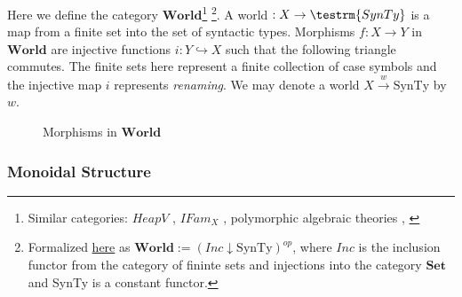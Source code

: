 \documentclass{article}
\newcommand{\world}{{\mathbf{World}}}
\begin{document}
 Here we define the category $\world$\footnote{Similar categories: $HeapV$ \cite{SIMPSON-Independence}, 
 $IFam_X$ \cite{sterlingFreeTheoremsUnivalent}, polymorphic algebraic theories \cite{fioreMultiversalPolymorphicAlgebraic2013},
 \cite{sterlingSyntaxSemanticsAbstract2016}}
 \footnote{Formalized 
 \href{https://github.com/bond15/Bunched-CBPV/blob/68f8b4d006edc9df1d830d7f9cc63822ec77a379/src/Data/Worlds.agda#L33}{here} 
 as $\world := (Inc \downarrow \textrm{SynTy})^{op}$, where $Inc$ is the inclusion functor from the category of fininte sets 
 and injections into the category $\mathbf{Set}$ and SynTy is a constant functor.}. 
 A world $: X \rightarrow \testrm{SynTy}$ is a map from a finite set into the set of syntactic types. Morphisms $f : X \rightarrow Y$ 
 in $\world$ are injective functions $i : Y \hookrightarrow X$ such that the 
 following triangle commutes. The finite sets here represent a finite 
 collection of case symbols and the injective map $i$ represents \textit{renaming}. We may denote a world $X \xrightarrow{w} \textrm{SynTy}$ 
 by $w$.
 

\begin{figure}[!ht]
    \centering
\caption{Morphisms in $\world$}
\end{figure}
 
 
\begin{comment}
Previously, I had maps between worlds as injections where the source map was 
included in the domain map. I've flipped the ordering to make the DCC obviously 
affine(monoidal unit is isomorphic to cartesian unit).    
\end{comment}



  \subsubsection{Monoidal Structure}
\end{document}
